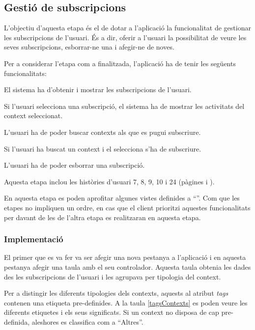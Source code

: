 \subsection{Gestió de subscripcions}

L'objectiu d'aquesta etapa és el de dotar a l'aplicació la funcionalitat de gestionar les subscripcions de l'usuari. És a dir, oferir a l'usuari la possibilitat de veure les seves subscripcions, esborrar-ne una i afegir-ne de noves.

Per a considerar l'etapa com a finalitzada, l'aplicació ha de tenir les següents funcionalitats:

\begin{compactitem}
    \item El sistema ha d'obtenir i mostrar les subscripcions de l'usuari.
    \item Si l'usuari selecciona una subscripció, el sistema ha de mostrar les activitats del context seleccionat.
    \item L'usuari ha de poder buscar contexts als que es pugui subscriure.
    \item Si l'usuari ha buscat un context i el selecciona s'ha de subscriure.
    \item L'usuari ha de poder esborrar una subscripció.
\end{compactitem}

Aquesta etapa inclou les històries d'usuari 7, 8, 9, 10 i 24 (pàgines \pageref{sec:historia_7} i \pageref{sec:historia_24}).

En aquesta etapa es poden aprofitar algunes vistes definides a ``''. Com que les etapes no impliquen un ordre, en cas que el client prioritzi aquestes funcionalitats per davant de les de l'altra etapa es realitzaran en aquesta etapa.

\subsubsection{Implementació}

El primer que es va fer va ser afegir una nova pestanya a l'aplicació i en aquesta pestanya afegir una taula amb el seu controlador. Aquesta taula obtenia les dades des les subscripcions de l'usuari i les agrupava per tipologia del context.

Per a distingir les diferents tipologies dels contexts, aquests al atribut \textit{tags} contenen una etiqueta pre-definides. A la taula \ref{tagsContexts} es poden veure les diferents etiquetes i els seus significats. Si un context no disposa de cap pre-definida, aleshores es classifica com a ``Altres''.

